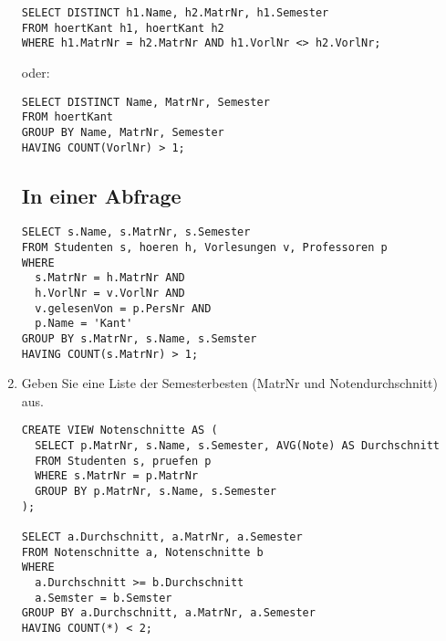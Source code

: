 \documentclass{lehramt-informatik-aufgabe}
\begin{document}
\begin{enumerate}
\begin{liAntwort}
\begin{verbatim}
SELECT DISTINCT h1.Name, h2.MatrNr, h1.Semester
FROM hoertKant h1, hoertKant h2
WHERE h1.MatrNr = h2.MatrNr AND h1.VorlNr <> h2.VorlNr;
\end{verbatim}

oder:

\begin{verbatim}
SELECT DISTINCT Name, MatrNr, Semester
FROM hoertKant
GROUP BY Name, MatrNr, Semester
HAVING COUNT(VorlNr) > 1;
\end{verbatim}

\subsection*{In einer Abfrage}

\begin{verbatim}
SELECT s.Name, s.MatrNr, s.Semester
FROM Studenten s, hoeren h, Vorlesungen v, Professoren p
WHERE
  s.MatrNr = h.MatrNr AND
  h.VorlNr = v.VorlNr AND
  v.gelesenVon = p.PersNr AND
  p.Name = 'Kant'
GROUP BY s.MatrNr, s.Name, s.Semster
HAVING COUNT(s.MatrNr) > 1;
\end{verbatim}
\end{liAntwort}


\item Geben Sie eine Liste der Semesterbesten (MatrNr und
Notendurchschnitt) aus.

\begin{liAntwort}
\begin{verbatim}
CREATE VIEW Notenschnitte AS (
  SELECT p.MatrNr, s.Name, s.Semester, AVG(Note) AS Durchschnitt
  FROM Studenten s, pruefen p
  WHERE s.MatrNr = p.MatrNr
  GROUP BY p.MatrNr, s.Name, s.Semester
);

SELECT a.Durchschnitt, a.MatrNr, a.Semester
FROM Notenschnitte a, Notenschnitte b
WHERE
  a.Durchschnitt >= b.Durchschnitt
  a.Semster = b.Semster
GROUP BY a.Durchschnitt, a.MatrNr, a.Semester
HAVING COUNT(*) < 2;
\end{verbatim}
\end{liAntwort}

\end{enumerate}
\end{document}
